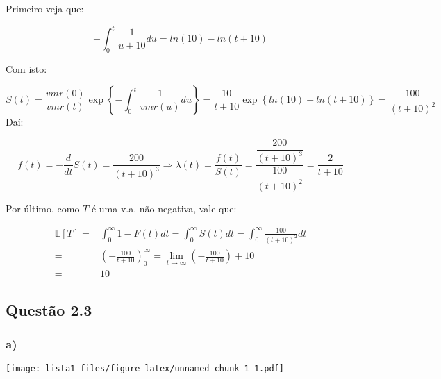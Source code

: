 \documentclass[
]{article}
\begin{document}
Primeiro veja que:

\[
-\int_0^t\frac{1}{u+10}du=ln(10)-ln(t+10)
\]

Com isto:

\[
S(t)=\frac{vmr(0)}{vmr(t)}\exp \left \{ -\int_0^t\frac{1}{vmr(u)}du \right \}=\frac{10}{t+10}\exp \left \{ ln(10)-ln(t+10) \right \} = \frac{100}{(t+10)^2}
\] Daí:

\[
f (t)= -\frac{d}{dt}S(t)=\frac{200}{(t+10)^3} \Longrightarrow \lambda(t) = \dfrac{f(t)}{S(t)} = \dfrac{\dfrac{200}{(t+10)^{3}}}{\dfrac{100}{(t+10)^{2}}} = \dfrac{2}{t+10}
\]

Por último, como \(T\) é uma v.a. não negativa, vale que:

\[
\begin{aligned}
\mathbb{E}[T]=&\int_0^\infty 1-F(t) dt=\int_0^\infty S(t) dt = \int_0^\infty  \frac{100}{(t+10)^2} dt\\
=&\left (-\frac{100}{t+10}\right)_0^\infty=\lim_{t \rightarrow\infty}\left(-\frac{100}{t+10}\right)+10\\
=&10
\end{aligned}
\]

\hypertarget{questuxe3o-2.3}{%
\subsection{Questão 2.3}\label{questuxe3o-2.3}}

\hypertarget{a}{%
\subsubsection{a)}\label{a}}

\texttt{[image: lista1\_files/figure-latex/unnamed-chunk-1-1.pdf]}
\end{document}
